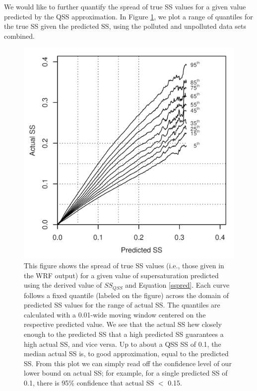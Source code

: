 \documentclass{article}
\begin{document}
We would like to further quantify the spread of true SS values for a given value predicted by the QSS approximation. In Figure \ref{ssquantiles}, we plot a range of quantiles for the true SS given the predicted SS, using the polluted and unpolluted data sets combined.%
\begin{figure}[ht]
	\centering
	\includegraphics[width=\textwidth]{wrf/18supersat_predict.png}
	\caption{This figure shows the spread of true SS values (i.e., those given in the WRF output) for a given value of supersaturation predicted using the derived value of $SS_{QSS}$ and Equation \ref{sspred}. Each curve follows a fixed quantile (labeled on the figure) across the domain of predicted SS values for the range of actual SS. The quantiles are calculated with a 0.01-wide moving window centered on the respective predicted value. We see that the actual SS hew closely enough to the predicted SS that a high predicted SS guarantees a high actual SS, and vice versa. Up to about a QSS SS of 0.1, the median actual SS is, to good approximation, equal to the predicted SS. From this plot we can simply read off the confidence level of our lower bound on actual SS; for example, for a single predicted SS of 0.1, there is 95\% confidence that actual SS $<$ 0.15.}
	\label{ssquantiles}
\end{figure}
\end{document}
